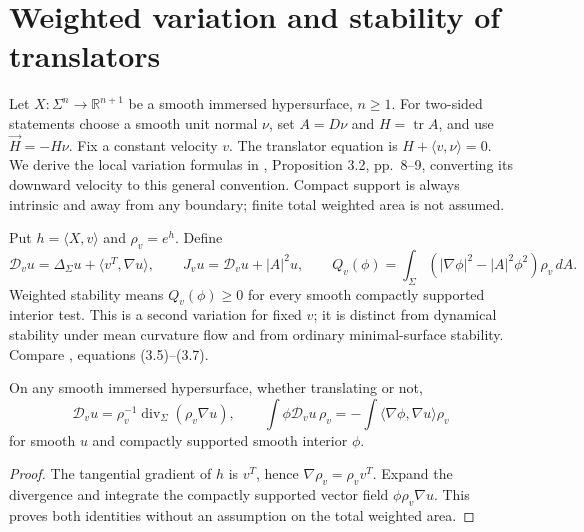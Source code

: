 \chapter{Weighted variation and stability of translators}\label{sec:translator-variation}
Let $X:\Sigma^n\to\mathbb R^{n+1}$ be a smooth immersed hypersurface, $n\ge1$. For two-sided statements choose a smooth unit normal $\nu$, set $A=D\nu$ and $H=\operatorname{tr}A$, and use $\vec H=-H\nu$. Fix a constant velocity $v$. The translator equation is $H+\langle v,\nu\rangle=0$. We derive the local variation formulas in \cite{HIMW19}, Proposition 3.2, pp.~8--9, converting its downward velocity to this general convention. Compact support is always intrinsic and away from any boundary; finite total weighted area is not assumed.

\begin{definition}\label{def:translator-jacobi-weight}
Put $h=\langle X,v\rangle$ and $\rho_v=e^h$. Define
\[
 \mathcal D_v u=\Delta_\Sigma u+\langle v^T,\nabla u\rangle,
 \qquad J_vu=\mathcal D_vu+|A|^2u,
 \qquad Q_v(\phi)=\int_\Sigma(|\nabla\phi|^2-|A|^2\phi^2)\rho_v\,dA.
\]
Weighted stability means $Q_v(\phi)\ge0$ for every smooth compactly supported interior test. This is a second variation for fixed $v$; it is distinct from dynamical stability under mean curvature flow and from ordinary minimal-surface stability. Compare \cite{HIMW19}, equations (3.5)--(3.7).
\end{definition}

\begin{lemma}\label{lem:translator-weighted-parts}
On any smooth immersed hypersurface, whether translating or not,
\[
 \mathcal D_vu=\rho_v^{-1}\operatorname{div}_\Sigma(\rho_v\nabla u),
 \qquad \int\phi\mathcal D_vu\,\rho_v=-\int\langle\nabla\phi,\nabla u\rangle\rho_v
\]
for smooth $u$ and compactly supported smooth interior $\phi$.
\end{lemma}
\begin{proof}
The tangential gradient of $h$ is $v^T$, hence $\nabla\rho_v=\rho_vv^T$. Expand the divergence and integrate the compactly supported vector field $\phi\rho_v\nabla u$. This proves both identities without an assumption on the total weighted area.
\end{proof}

